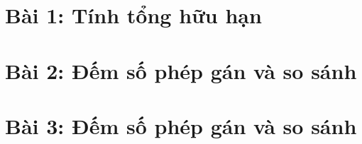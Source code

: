 \documentclass[12pt]{report}
\begin{document}

    \section*{Bài 1: Tính tổng hữu hạn}
    
    

    \section*{Bài 2: Đếm số phép gán và so sánh}
    

    \section*{Bài 3: Đếm số phép gán và so sánh}
    

\end{document}
